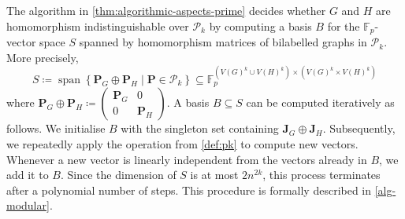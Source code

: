 \documentclass[a4paper,onecolumn,11pt,accepted=2026-01-06]{quantumarticle}
\theoremstyle{plain}
\theoremstyle{remark}
\theoremstyle{definition}
\DeclareMathOperator{\spn}{span}
\begin{document}
The algorithm in \cref{thm:algorithmic-aspects-prime} decides whether $G$ and $H$ are homomorphism indistinguishable over $\mathcal{P}_k$ by computing a basis $B$ for the $\mathbb{F}_p$-vector space $S$ spanned by homomorphism matrices of bilabelled graphs in $\mathcal{P}_k$. More precisely,
\[
    S \coloneqq \spn\left\{ \boldsymbol{P}_G\oplus \boldsymbol{P}_H \mid \boldsymbol{P} \in \mathcal{P}_k \right\} \subseteq \mathbb{F}_p^{(V(G)^k \cup V(H)^k) \times (V(G)^k \times V(H)^k)}
\]
where $\boldsymbol{P}_G \oplus \boldsymbol{P}_H \coloneqq \left( \begin{smallmatrix} \boldsymbol{P}_G & 0 \\ 0 & \boldsymbol{P}_H \end{smallmatrix} \right)$.
A basis $B \subseteq S$ can be computed iteratively as follows.
We initialise $B$ with the singleton set containing $\boldsymbol{J}_G \oplus \boldsymbol{J}_H$.
Subsequently, we repeatedly apply the operation from \cref{def:pk} to compute new vectors. 
Whenever a new vector is linearly independent from the vectors already in $B$, we add it to $B$.
Since the dimension of $S$ is at most $2n^{2k}$, this process terminates after a polynomial number of steps.
This procedure is formally described in \cref{alg-modular}.
\end{document}
